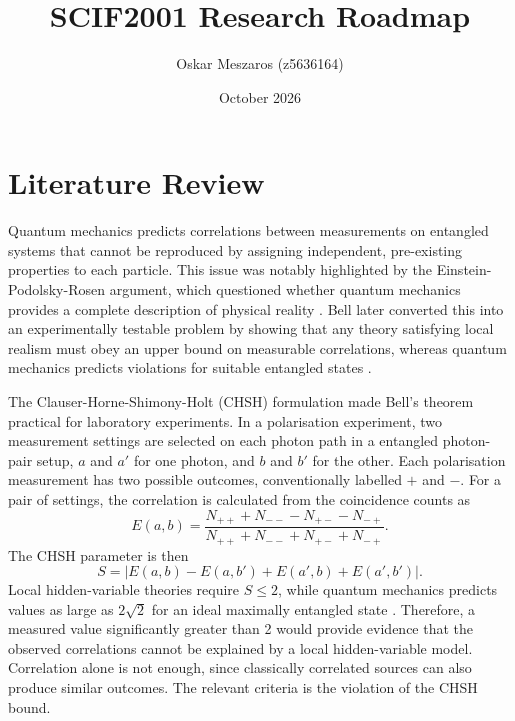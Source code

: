 \documentclass{article}
\title{SCIF2001 Research Roadmap}
\author{Oskar Meszaros (z5636164)}
\date{October 2026}
\begin{document}
\maketitle
\section{Literature Review}
Quantum mechanics predicts correlations between measurements on entangled systems that cannot be reproduced by assigning independent, pre-existing properties to each particle. This issue was notably highlighted by the Einstein-Podolsky-Rosen argument, which questioned whether quantum mechanics provides a complete description of physical reality \parencite{einsteinCanQuantumMechanicalDescription1935}. Bell later converted this into an experimentally testable problem by showing that any theory satisfying local realism must obey an upper bound on measurable correlations, whereas quantum mechanics predicts violations for suitable entangled states \parencite{bellEinsteinPodolskyRosen1964}.

The Clauser-Horne-Shimony-Holt (CHSH) formulation made Bell's theorem practical for laboratory experiments. In a polarisation experiment, two measurement settings are selected on each photon path in a entangled photon-pair setup, $a$ and $a'$ for one photon, and $b$ and $b'$ for the other. Each polarisation measurement has two possible outcomes, conventionally labelled $+$ and $-$. For a pair of settings, the correlation is calculated from the coincidence counts as
\begin{equation}
    E(a,b)=\frac{N_{++}+N_{--}-N_{+-}-N_{-+}}{N_{++}+N_{--}+N_{+-}+N_{-+}}. \label{eq:1}
\end{equation}
The CHSH parameter is then
\begin{equation}
    S=\left| E(a,b)-E(a,b')+E(a',b)+E(a',b') \right|.\label{eq:2}
\end{equation}
Local hidden-variable theories require $S\leq 2$, while quantum mechanics predicts values as large as $2\sqrt{2}$ for an ideal maximally entangled state \parencite{clauserProposedExperimentTest1969}. Therefore, a measured value significantly greater than 2 would provide evidence that the observed correlations cannot be explained by a local hidden-variable model. Correlation alone is not enough, since classically correlated sources can also produce similar outcomes. The relevant criteria is the violation of the CHSH bound.
\end{document}
